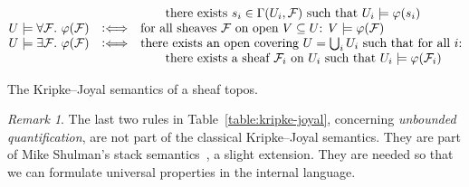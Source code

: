 \documentclass[10pt,reqno,a4paper]{amsbook}
\theoremstyle{definition}
\theoremstyle{plain}
\theoremstyle{remark}
\newtheorem{rem}[defn]{Remark}
\newcommand{\F}{\mathcal{F}}
\newcommand{\?}{\,{:}\,}
\renewcommand{\_}{\mathpunct{.}\,}
\newcommand{\Ll}{\vcentcolon\Longleftrightarrow}
\begin{document}
\begin{table}
\[\begin{array}{@{}lcl@{}}
    && \quad\quad \text{there exists~$s_i \in \Gamma(U_i, \F)$ such that
    $U_i \models \varphi(s_i)$} \\
    U \models \forall \F\_ \varphi(\F) &\Ll&
      \text{for all sheaves $\F$ on open $V \subseteq U$: $V \models \varphi(\F)$} \\
    U \models \exists \F\_ \varphi(\F) &\Ll&
      \text{there exists an open covering $U = \bigcup_i U_i$ such that for all~$i$:} \\
    && \quad\quad \text{there exists a sheaf~$\F_i$ on~$U_i$ such that
    $U_i \models \varphi(\F_i)$}
  \end{array} \]
  \caption{\label{table:kripke-joyal}The Kripke--Joyal semantics of a sheaf
  topos.}
\end{table}

\begin{rem}The last two rules in Table~\ref{table:kripke-joyal}, concerning
\emph{unbounded quantification}, are not part of the classical Kripke--Joyal
semantics. They are part of Mike Shulman's stack semantics~\cite{shulman:stack},
a slight extension. They are needed so that we can formulate universal
properties in the internal language.
\end{rem}
\end{document}
